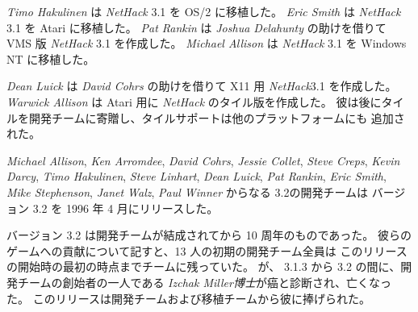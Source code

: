 \medskip
{\it Timo Hakulinen} は {\it NetHack\/} 3.1 を OS/2 に移植した。
{\it Eric Smith} は {\it NetHack\/} 3.1 を Atari に移植した。
{\it Pat Rankin} は {\it Joshua Delahunty} の助けを借りて VMS 版
{\it NetHack\/} 3.1 を作成した。
{\it Michael Allison} は {\it NetHack\/} 3.1 を Windows NT に移植した。

\medskip
{\it Dean Luick} は {\it David Cohrs} の助けを借りて X11 用
{\it NetHack\/}3.1 を作成した。
{\it Warwick Allison} は Atari 用に {\it NetHack\/} のタイル版を作成した。
彼は後にタイルを開発チームに寄贈し、タイルサポートは他のプラットフォームにも
追加された。

\medskip
{\it Michael Allison}, {\it Ken Arromdee},
{\it David Cohrs}, {\it Jessie Collet}, {\it Steve Creps},
{\it Kevin Darcy}, {\it Timo Hakulinen}, {\it Steve Linhart}, {\it Dean Luick},
{\it Pat Rankin}, {\it Eric Smith}, {\it Mike Stephenson}, {\it Janet Walz},
{\it Paul Winner} からなる 3.2の開発チームは バージョン 3.2 を
1996 年 4 月にリリースした。

\medskip
バージョン 3.2 は開発チームが結成されてから 10 周年のものであった。
彼らのゲームへの貢献について記すと、13 人の初期の開発チーム全員は
このリリースの開始時の最初の時点までチームに残っていた。
が、 3.1.3 から 3.2 の間に、開発チームの創始者の一人である
{\it Izchak Miller博士}が癌と診断され、亡くなった。
このリリースは開発チームおよび移植チームから彼に捧げられた。


